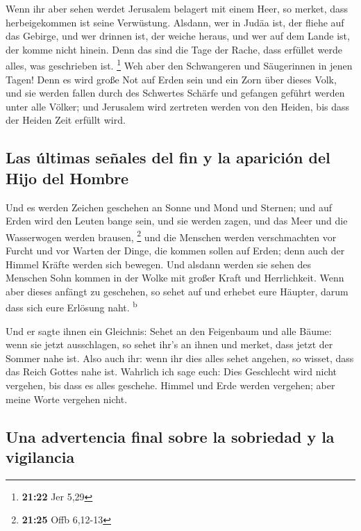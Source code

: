  Wenn ihr aber sehen werdet Jerusalem belagert mit einem
Heer, so merket, dass herbeigekommen ist seine Verwüstung.
 Alsdann, wer in Judäa ist, der fliehe auf das Gebirge,
und wer drinnen ist, der weiche heraus, und wer auf dem Lande ist, der
komme nicht hinein.  Denn das sind die Tage der Rache,
dass erfüllet werde alles, was geschrieben ist. \footnote{\textbf{21:22}
  Jer 5,29}  Weh aber den Schwangeren und Säugerinnen in
jenen Tagen! Denn es wird große Not auf Erden sein und ein Zorn über
dieses Volk,  und sie werden fallen durch des Schwertes
Schärfe und gefangen geführt werden unter alle Völker; und Jerusalem
wird zertreten werden von den Heiden, bis dass der Heiden Zeit erfüllt
wird.

\hypertarget{las-uxfaltimas-seuxf1ales-del-fin-y-la-apariciuxf3n-del-hijo-del-hombre}{%
\subsection{Las últimas señales del fin y la aparición del Hijo del
Hombre}\label{las-uxfaltimas-seuxf1ales-del-fin-y-la-apariciuxf3n-del-hijo-del-hombre}}

 Und es werden Zeichen geschehen an Sonne und Mond und
Sternen; und auf Erden wird den Leuten bange sein, und sie werden zagen,
und das Meer und die Wasserwogen werden brausen, \footnote{\textbf{21:25}
  Offb 6,12-13}  und die Menschen werden verschmachten
vor Furcht und vor Warten der Dinge, die kommen sollen auf Erden; denn
auch der Himmel Kräfte werden sich bewegen.  Und alsdann
werden sie sehen des Menschen Sohn kommen in der Wolke mit großer Kraft
und Herrlichkeit.  Wenn aber dieses anfängt zu geschehen,
so sehet auf und erhebet eure Häupter, darum dass sich eure Erlösung
naht. \textsuperscript{b}

 Und er sagte ihnen ein Gleichnis: Sehet an den
Feigenbaum und alle Bäume:  wenn sie jetzt ausschlagen,
so sehet ihr's an ihnen und merket, dass jetzt der Sommer nahe ist.
 Also auch ihr: wenn ihr dies alles sehet angehen, so
wisset, dass das Reich Gottes nahe ist.  Wahrlich ich
sage euch: Dies Geschlecht wird nicht vergehen, bis dass es alles
geschehe.  Himmel und Erde werden vergehen; aber meine
Worte vergehen nicht.

\hypertarget{una-advertencia-final-sobre-la-sobriedad-y-la-vigilancia}{%
\subsection{Una advertencia final sobre la sobriedad y la
vigilancia}\label{una-advertencia-final-sobre-la-sobriedad-y-la-vigilancia}}


